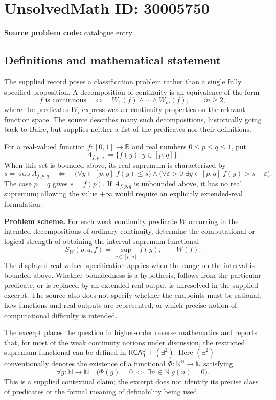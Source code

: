 \documentclass[11pt]{article}
\newcommand{\N}{\mathbb{N}}
\newcommand{\R}{\mathbb{R}}
\begin{document}
\section*{UnsolvedMath ID: 30005750}
\textbf{Source problem code:} catalogue entry
\subsection{Definitions and mathematical statement}
The supplied record poses a classification problem rather than a single fully specified proposition. A decomposition of continuity is an equivalence of the form
\[
 f\text{ is continuous}\quad\Longleftrightarrow\quad W_1(f)\land\cdots\land W_m(f),\qquad m\geq 2,
\]
where the predicates \(W_i\) express weaker continuity properties on the relevant function space. The source describes many such decompositions, historically going back to Baire, but supplies neither a list of the predicates nor their definitions.

For a real-valued function \(f:[0,1]\to\R\) and real numbers \(0\leq p\leq q\leq1\), put
\[
 A_{f,p,q}:=\{f(y):y\in[p,q]\}.
\]
When this set is bounded above, its real supremum is characterized by
\[
 s=\sup A_{f,p,q}
 \quad\Longleftrightarrow\quad
 \bigl(\forall y\in[p,q]\;f(y)\leq s\bigr)
 \land
 \bigl(\forall\varepsilon>0\;\exists y\in[p,q]\;f(y)>s-\varepsilon\bigr).
\]
The case \(p=q\) gives \(s=f(p)\). If \(A_{f,p,q}\) is unbounded above, it has no real supremum; allowing the value \(+\infty\) would require an explicitly extended-real formulation.

\textbf{Problem scheme.} For each weak continuity predicate \(W\) occurring in the intended decompositions of ordinary continuity, determine the computational or logical strength of obtaining the interval-supremum functional
\[
 S_W(p,q,f)=\sup_{y\in[p,q]}f(y),\qquad W(f).
\]
The displayed real-valued specification applies when the range on the interval is bounded above. Whether boundedness is a hypothesis, follows from the particular predicate, or is replaced by an extended-real output is unresolved in the supplied excerpt. The source also does not specify whether the endpoints must be rational, how functions and real outputs are represented, or which precise notion of computational difficulty is intended.

The excerpt places the question in higher-order reverse mathematics and reports that, for most of the weak continuity notions under discussion, the restricted supremum functional can be defined in \(\mathsf{RCA}_0^{\omega}+(\exists^2)\). Here \((\exists^2)\) conventionally denotes the existence of a functional \(\Phi:\N^{\N}\to\N\) satisfying
\[
 \forall g:\N\to\N\quad
 \bigl(\Phi(g)=0\ \Longleftrightarrow\ \exists n\in\N\;g(n)=0\bigr).
\]
This is a supplied contextual claim; the excerpt does not identify its precise class of predicates or the formal meaning of definability being used.
\end{document}
